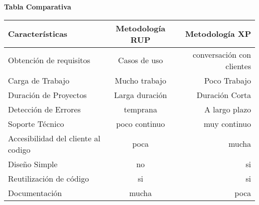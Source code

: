 \documentclass[10pt,a4paper]{article}
\begin{document}
\begin {center} \textbf{Tabla Comparativa}
\end{center}
\begin{tabular}{||l | c | r||}
\hline
\hline
Caracter\' isticas & Metodolog\' ia RUP & Metodolog\' ia XP \\
\hline
\hline

Obtenci\' on de requisitos& Casos de uso & conversaci\'on con clientes\\
\hline
Carga de Trabajo & Mucho trabajo & Poco Trabajo\\
\hline
Duraci\'on de Proyectos & Larga duraci\' on & Duraci\' on Corta\\
\hline
Detecci\'on de Errores & temprana & A largo plazo\\
\hline
Soporte T\' ecnico & poco continuo & muy continuo\\
\hline
Accesibilidad del cliente al codigo & poca & mucha \\
\hline
Dise\~ no Simple & no & si \\
\hline
Reutilizaci\'on de c\'odigo & si & si \\
\hline
Documentaci\'on & mucha & poca \\
\hline



\end{tabular}
\end{document}
